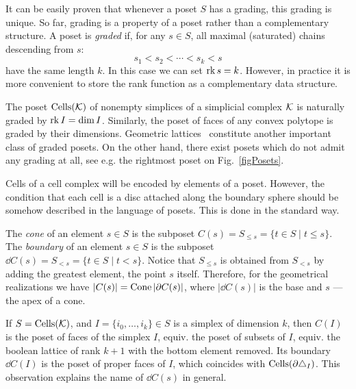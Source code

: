 \begin{rem}\label{remRankUnique}
It can be easily proven that whenever a poset $S$ has a grading, this grading is unique. So far, grading is a property of a poset rather than a complementary structure. A poset is \emph{graded} if, for any $s\in S$, all maximal (saturated) chains descending from $s$:
\[
s_1<s_2<\cdots<s_k<s
\]
have the same length $k$. In this case we can set $\operatorname{rk} s=k$. However, in practice it is more convenient to store the rank function as a complementary data structure.
\end{rem}

\begin{ex}\label{exGradingExistsNot}
The poset $\operatorname{Cells}(\mathcal{K})$ of nonempty simplices of a simplicial complex $\mathcal{K}$ is naturally graded by $\operatorname{rk} I=\dim I$. Similarly, the poset of faces of any convex polytope is graded by their dimensions. Geometric lattices~\cite{CrapoComb} constitute another important class of graded posets. On the other hand, there exist posets which do not admit any grading at all, see e.g. the rightmost poset on Fig.~\ref{figPosets}.
\end{ex}

Cells of a cell complex will be encoded by elements of a poset. However, the condition that each cell is a disc attached along the boundary sphere should be somehow described in the language of posets. This is done in the standard way.

\begin{con}\label{conCones}
The \emph{cone} of an element $s\in S$ is the subposet $C(s)=S_{\leq s}=\{t\in S\mid t\leq s\}$. The \emph{boundary} of an element $s\in S$ is the subposet $\dd C(s)=S_{<s}=\{t\in S\mid t<s\}$. Notice that $S_{\leq s}$ is obtained from $S_{<s}$ by adding the greatest element, the point $s$ itself. Therefore, for the geometrical realizations we have $|C(s)|=\operatorname{Cone}|\partial C(s)|$, where $|\dd C(s)|$ is the base and $s$ --- the apex of a cone.
\end{con}

\begin{ex}\label{exDownConeSimplex}
If $S=\operatorname{Cells}(\mathcal{K})$, and $I=\{i_0,\ldots,i_k\}\in S$ is a simplex of dimension $k$, then $C(I)$ is the poset of faces of the simplex $I$, equiv. the poset of subsets of $I$, equiv. the boolean lattice of rank $k+1$ with the bottom element removed. Its boundary $\dd C(I)$ is the poset of proper faces of $I$, which coincides with $\operatorname{Cells}(\partial\triangle_I)$. This observation explains the name of $\dd C(s)$ in general.
\end{ex}


